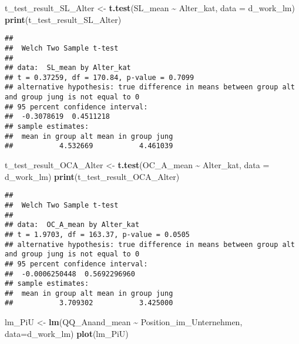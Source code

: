 \documentclass[
]{article}
\newenvironment{Shaded}{\begin{snugshade}}{\end{snugshade}}
\newcommand{\AttributeTok}[1]{\textcolor[rgb]{0.13,0.29,0.53}{#1}}
\newcommand{\FunctionTok}[1]{\textcolor[rgb]{0.13,0.29,0.53}{\textbf{#1}}}
\newcommand{\NormalTok}[1]{#1}
\newcommand{\OtherTok}[1]{\textcolor[rgb]{0.56,0.35,0.01}{#1}}
\newcommand{\SpecialCharTok}[1]{\textcolor[rgb]{0.81,0.36,0.00}{\textbf{#1}}}
\begin{document}
\begin{Shaded}
\begin{Highlighting}[]
\NormalTok{t\_test\_result\_SL\_Alter }\OtherTok{\textless{}{-}} \FunctionTok{t.test}\NormalTok{(SL\_mean }\SpecialCharTok{\textasciitilde{}}\NormalTok{ Alter\_kat, }\AttributeTok{data =}\NormalTok{ d\_work\_lm)}
\FunctionTok{print}\NormalTok{(t\_test\_result\_SL\_Alter)}
\end{Highlighting}
\end{Shaded}

\begin{verbatim}
## 
##  Welch Two Sample t-test
## 
## data:  SL_mean by Alter_kat
## t = 0.37259, df = 170.84, p-value = 0.7099
## alternative hypothesis: true difference in means between group alt and group jung is not equal to 0
## 95 percent confidence interval:
##  -0.3078619  0.4511218
## sample estimates:
##  mean in group alt mean in group jung 
##           4.532669           4.461039
\end{verbatim}

\begin{Shaded}
\begin{Highlighting}[]
\NormalTok{t\_test\_result\_OCA\_Alter }\OtherTok{\textless{}{-}} \FunctionTok{t.test}\NormalTok{(OC\_A\_mean }\SpecialCharTok{\textasciitilde{}}\NormalTok{ Alter\_kat, }\AttributeTok{data =}\NormalTok{ d\_work\_lm)}
\FunctionTok{print}\NormalTok{(t\_test\_result\_OCA\_Alter)}
\end{Highlighting}
\end{Shaded}

\begin{verbatim}
## 
##  Welch Two Sample t-test
## 
## data:  OC_A_mean by Alter_kat
## t = 1.9703, df = 163.37, p-value = 0.0505
## alternative hypothesis: true difference in means between group alt and group jung is not equal to 0
## 95 percent confidence interval:
##  -0.0006250448  0.5692296960
## sample estimates:
##  mean in group alt mean in group jung 
##           3.709302           3.425000
\end{verbatim}

\begin{Shaded}
\begin{Highlighting}[]
\NormalTok{lm\_PiU }\OtherTok{\textless{}{-}} \FunctionTok{lm}\NormalTok{(QQ\_Anand\_mean }\SpecialCharTok{\textasciitilde{}}\NormalTok{ Position\_im\_Unternehmen, }\AttributeTok{data=}\NormalTok{d\_work\_lm)}
\FunctionTok{plot}\NormalTok{(lm\_PiU)}
\end{Highlighting}
\end{Shaded}
\end{document}
